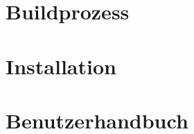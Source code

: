 \section{Buildprozess}

\section{Installation}

\section{Benutzerhandbuch}
































